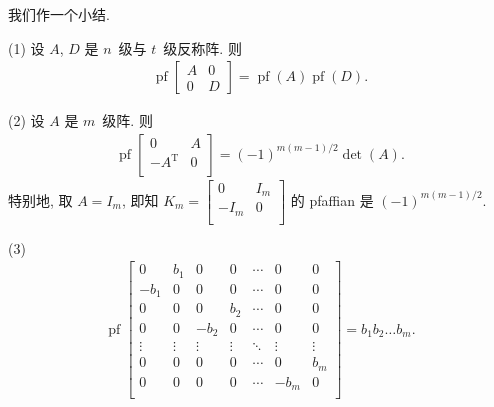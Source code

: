 我们作一个小结.

\begin{theorem}
    (1)
    设 \(A\), \(D\) 是 \(n\)~级与 \(t\)~级反称阵.
    则
    \begin{align*}
        \operatorname{pf} {
            \begin{bmatrix}
                A & 0 \\
                0 & D
            \end{bmatrix}
        }
        = \operatorname{pf} {(A)} \operatorname{pf} {(D)}.
    \end{align*}

    (2)
    设 \(A\) 是 \(m\)~级阵.
    则
    \begin{align*}
        \operatorname{pf} {
            \begin{bmatrix}
                0               & A \\
                -A^{\mathrm{T}} & 0 \\
            \end{bmatrix}
        } = (-1)^{m(m-1)/2} \det {(A)}.
    \end{align*}
    特别地, 取 \(A = I_m\), 即知
    \(K_m = \begin{bmatrix}
        0    & I_m \\
        -I_m & 0   \\
    \end{bmatrix}\)
    的 pfaffian 是 \((-1)^{m(m-1)/2}\).

    (3)
    \begin{align*}
        \operatorname{pf} {
            \begin{bmatrix}
                0      & b_1    & 0      & 0      & \cdots & 0      & 0      \\
                -b_1   & 0      & 0      & 0      & \cdots & 0      & 0      \\
                0      & 0      & 0      & b_2    & \cdots & 0      & 0      \\
                0      & 0      & -b_2   & 0      & \cdots & 0      & 0      \\
                \vdots & \vdots & \vdots & \vdots & \ddots & \vdots & \vdots \\
                0      & 0      & 0      & 0      & \cdots & 0      & b_m    \\
                0      & 0      & 0      & 0      & \cdots & -b_m   & 0      \\
            \end{bmatrix}
        } = b_1 b_2 \dots b_m.
    \end{align*}
\end{theorem}

